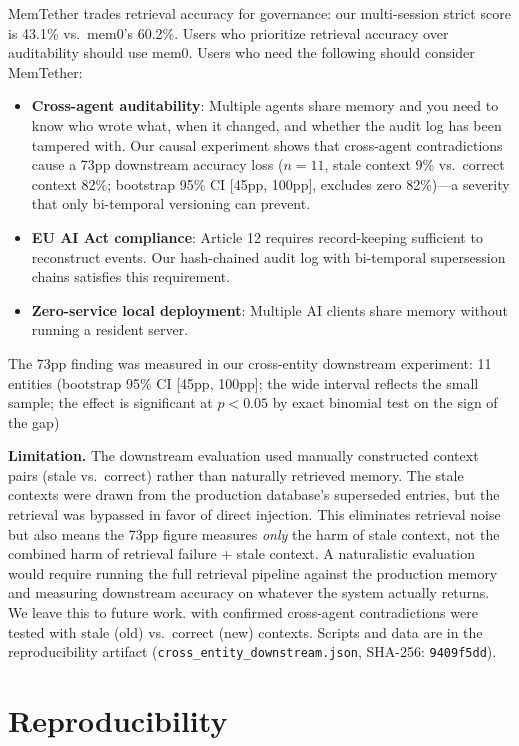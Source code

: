 \documentclass{article}
\begin{document}
MemTether trades retrieval accuracy for governance: our multi-session strict score is 43.1\% vs.\ mem0's 60.2\%. Users who prioritize retrieval accuracy over auditability should use mem0. Users who need the following should consider MemTether:
\begin{itemize}
\item \textbf{Cross-agent auditability}: Multiple agents share memory and you need to know who wrote what, when it changed, and whether the audit log has been tampered with. Our causal experiment shows that cross-agent contradictions cause a 73pp downstream accuracy loss ($n{=}11$, stale context 9\% vs.\ correct context 82\%; bootstrap 95\% CI [45pp, 100pp], excludes zero 82\%)---a severity that only bi-temporal versioning can prevent.
\item \textbf{EU AI Act compliance}: Article 12 requires record-keeping sufficient to reconstruct events. Our hash-chained audit log with bi-temporal supersession chains satisfies this requirement.
\item \textbf{Zero-service local deployment}: Multiple AI clients share memory without running a resident server.
\end{itemize}

The 73pp finding was measured in our cross-entity downstream experiment: 11 entities (bootstrap 95\% CI [45pp, 100pp]; the wide interval reflects the small sample; the effect is significant at $p<0.05$ by exact binomial test on the sign of the gap)

\textbf{Limitation.} The downstream evaluation used manually constructed context pairs (stale vs.\ correct) rather than naturally retrieved memory. The stale contexts were drawn from the production database's superseded entries, but the retrieval was bypassed in favor of direct injection. This eliminates retrieval noise but also means the 73pp figure measures \emph{only} the harm of stale context, not the combined harm of retrieval failure + stale context. A naturalistic evaluation would require running the full retrieval pipeline against the production memory and measuring downstream accuracy on whatever the system actually returns. We leave this to future work. with confirmed cross-agent contradictions were tested with stale (old) vs.\ correct (new) contexts. Scripts and data are in the reproducibility artifact (\texttt{cross\_entity\_downstream.json}, SHA-256: \texttt{9409f5dd}).


\section{Reproducibility}
\label{sec:repro}
\end{document}
